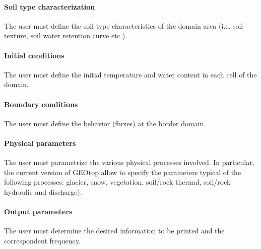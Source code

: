 \paragraph{Soil type characterization}
The user must define the soil type characteristics of the domain area (i.e. soil texture, soil water retention curve etc.).

\paragraph{Initial conditions}
The user must define the initial temperature and water content in each cell of the domain.

\paragraph{Boundary conditions}
The user must define the behavior (fluxes) at the border domain.

\paragraph{Physical parameters}
The user must parametrize the various physical processes involved. In particular, the current version of GEOtop allow to specify the parameters typical of the following processes: glacier, snow, vegetation, soil/rock thermal, soil/rock hydraulic and discharge).

\paragraph{Output parameters}
The user must determine the desired information to be printed and the correspondent frequency.



